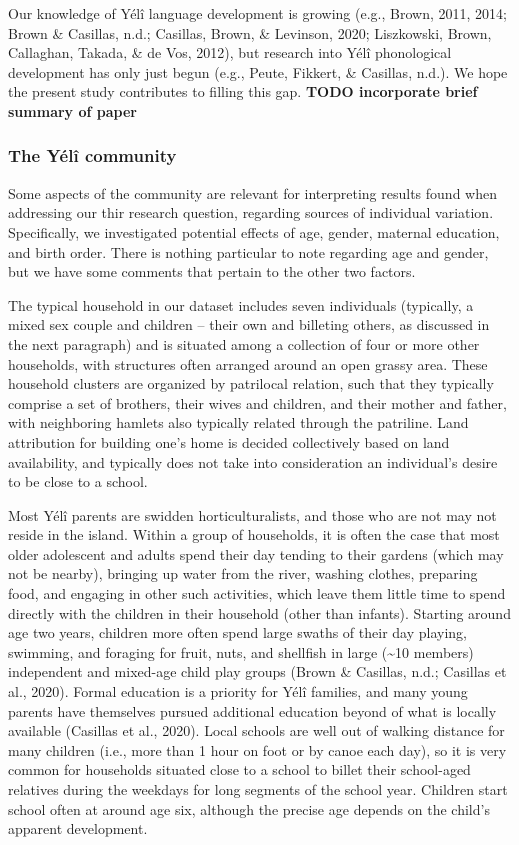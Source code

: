 \documentclass[english,,man,floatsintext]{apa6}
\begin{document}
Our knowledge of Yélî language development is growing (e.g., Brown, 2011, 2014; Brown \& Casillas, n.d.; Casillas, Brown, \& Levinson, 2020; Liszkowski, Brown, Callaghan, Takada, \& de Vos, 2012), but research into Yélî phonological development has only just begun (e.g., Peute, Fikkert, \& Casillas, n.d.). We hope the present study contributes to filling this gap. \textbf{TODO incorporate brief summary of paper}

\hypertarget{the-yuxe9luxee-community}{%
\subsubsection{The Yélî community}\label{the-yuxe9luxee-community}}

Some aspects of the community are relevant for interpreting results found when addressing our thir research question, regarding sources of individual variation. Specifically, we investigated potential effects of age, gender, maternal education, and birth order. There is nothing particular to note regarding age and gender, but we have some comments that pertain to the other two factors.

The typical household in our dataset includes seven individuals (typically, a mixed sex couple and children -- their own and billeting others, as discussed in the next paragraph) and is situated among a collection of four or more other households, with structures often arranged around an open grassy area. These household clusters are organized by patrilocal relation, such that they typically comprise a set of brothers, their wives and children, and their mother and father, with neighboring hamlets also typically related through the patriline. Land attribution for building one's home is decided collectively based on land availability, and typically does not take into consideration an individual's desire to be close to a school.

Most Yélî parents are swidden horticulturalists, and those who are not may not reside in the island. Within a group of households, it is often the case that most older adolescent and adults spend their day tending to their gardens (which may not be nearby), bringing up water from the river, washing clothes, preparing food, and engaging in other such activities, which leave them little time to spend directly with the children in their household (other than infants). Starting around age two years, children more often spend large swaths of their day playing, swimming, and foraging for fruit, nuts, and shellfish in large (\textasciitilde{}10 members) independent and mixed-age child play groups (Brown \& Casillas, n.d.; Casillas et al., 2020). Formal education is a priority for Yélî families, and many young parents have themselves pursued additional education beyond of what is locally available (Casillas et al., 2020). Local schools are well out of walking distance for many children (i.e., more than 1 hour on foot or by canoe each day), so it is very common for households situated close to a school to billet their school-aged relatives during the weekdays for long segments of the school year. Children start school often at around age six, although the precise age depends on the child's apparent development.
\end{document}
